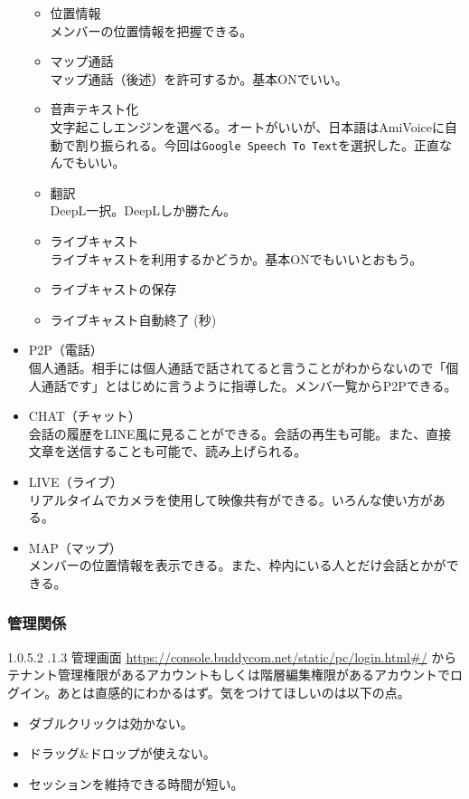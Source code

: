 \documentclass[dvipdfmx,jb5]{jarticle}
\makeatletter
\newcommand{\subsubsubsection}{\@startsection{paragraph}{4}{\z@}%
    {1.0\Cvs \@plus.5\Cdp \@minus.2\Cdp}%
    {.1\Cvs \@plus.3\Cdp}%
    {\large \bfseries}
  }
\makeatother
\begin{document}
\begin{itemize}
\begin{itemize}
\item 位置情報\\
メンバーの位置情報を把握できる。
\item マップ通話\\
マップ通話（後述）を許可するか。基本ONでいい。
\item 音声テキスト化\\
文字起こしエンジンを選べる。オートがいいが、日本語はAmiVoiceに自動で割り振られる。今回は\verb|Google Speech To Text|を選択した。正直なんでもいい。
\item 翻訳\\
DeepL一択。DeepLしか勝たん。
\item ライブキャスト\\
ライブキャストを利用するかどうか。基本ONでもいいとおもう。
\item ライブキャストの保存
\item ライブキャスト自動終了 (秒)
\end{itemize}
\item P2P（電話）\\
個人通話。相手には個人通話で話されてると言うことがわからないので「個人通話です」とはじめに言うように指導した。メンバ一覧からP2Pできる。
\item CHAT（チャット）\\
会話の履歴をLINE風に見ることができる。会話の再生も可能。また、直接文章を送信することも可能で、読み上げられる。
\item LIVE（ライブ）\\
リアルタイムでカメラを使用して映像共有ができる。いろんな使い方がある。
\item MAP（マップ）\\
メンバーの位置情報を表示できる。また、枠内にいる人とだけ会話とかができる。
\end{itemize}

\subsubsection{管理関係}
\subsubsubsection{管理画面}
\url{https://console.buddycom.net/static/pc/login.html#/} からテナント管理権限があるアカウントもしくは階層編集権限があるアカウントでログイン。あとは直感的にわかるはず。気をつけてほしいのは以下の点。

\begin{itemize}
\item ダブルクリックは効かない。
\item ドラッグ\&ドロップが使えない。
\item セッションを維持できる時間が短い。
\end{itemize}
\end{document}
